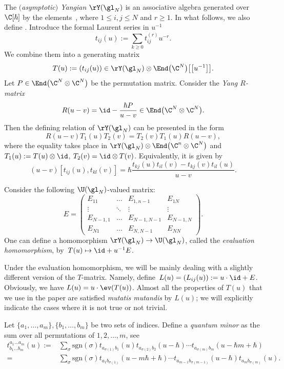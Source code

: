 The \emph{$($asymptotic$)$ Yangian} $\rY(\gl_N)$ is an associative algebra generated over $\C[\hbar]$ by the elements~, where $1\leq i,j \leq N$ and $r\geq 1$. In what follows, we also define . Introduce the formal Laurent series in $u^{-1}$
	\[
	t_{ij}(u) := \sum\limits_{k \geq 0} t_{ij}^{(r)} u^{-r}.
	\]
	We combine them into a generating matrix
	\[
	T(u) := (t_{ij}(u)) \in \rY(\gl_N) \otimes \End\bigl(\C^N\bigr)\bigl[\bigl[u^{-1}\bigr]\bigr].
	\]
	Let $P\in \End\bigl(\C^N \otimes \C^N\bigr)$ be the permutation matrix. Consider the \emph{Yang $R$-matrix}
	\[
	R(u-v) = \id - \frac{\hbar P}{u-v} \in \End\bigl(\C^N \otimes \C^N\bigr).
	\]
	Then the defining relation of $\rY(\gl_N)$ can be presented in the form
	\[
	R(u-v) T_1(u) T_2(v) = T_2(v) T_1(u) R(u-v),
	\]
	where the equality takes place in $\rY(\gl_N) \otimes \End\bigl(\C^n \otimes \C^N\bigr)$ and $T_1(u) := T(u) \otimes \id$, $T_2(v) = \id \otimes T(v)$. Equivalently, it is given by
	\begin{equation}
		\label{eq::yang_def_rel}
		(u-v) [t_{ij}(u), t_{kl}(v)] = \hbar \frac{t_{kj}(u) t_{il}(v) - t_{kj}(v) t_{il}(u)}{u-v}.
	\end{equation}
	
	
	Consider the following $\U(\gl_N)$-valued matrix:
	\begin{equation*}
		E = \begin{pmatrix}
			E_{11} & \dots & E_{1,n-1} & E_{1N} \\
			\vdots & \ddots & \vdots & \vdots \\
			E_{N-1,1} & \dots & E_{N-1,N-1} & E_{N-1,N} \\
			E_{N1} & \dots & E_{N,N-1} & E_{NN}
		\end{pmatrix}.
	\end{equation*}	
	One can define a homomorphism $\rY(\gl_N) \rightarrow \U(\gl_N)$, called the \emph{evaluation homomorphism}, by~${T(u) \mapsto \id + u^{-1} E}$.
	
	Under the evaluation homomorphism, we will be mainly dealing with a slightly different version of the $T$-matrix. Namely, define~${
		L(u) = (L_{ij}(u)) := u\cdot \id + E}$.
	Obviously, we have $L(u) = u\cdot \ev(T(u))$. Almost all the properties of $T(u)$ that we use in the paper are satisfied \emph{mutatis mutandis} by $L(u)$; we will explicitly indicate the cases where it is not true or not trivial.
	
	Let $\{a_1,\dots, a_m\}, \{b_1, \dots, b_m\}$ be two sets of indices. Define a \emph{quantum minor} as the sum over all permutations of $1,2,\dots,m$, see \cite[equations~(1.54) and (1.55)]{MolevYangians}
	\begin{align*}
			t_{b_1\dots b_m}^{a_1\dots a_m}(u) :={} & \sum\limits_{\sigma} \mathrm{sgn}(\sigma) t_{a_{\sigma(1)}b_1}(u) t_{a_{\sigma(2)} b_2}(u-\hbar) \cdots t_{a_{\sigma(m)} b_m} (u-\hbar m + \hbar) \\
			={} & \sum\limits_{\sigma} \mathrm{sgn}(\sigma) t_{a_1 b_{\sigma(1)}} (u-m\hbar+\hbar)\cdots t_{a_{m-1} b_{\sigma(m-1)}} (u-\hbar) t_{a_m b_{\sigma(m)}}(u).
	\end{align*}
	
